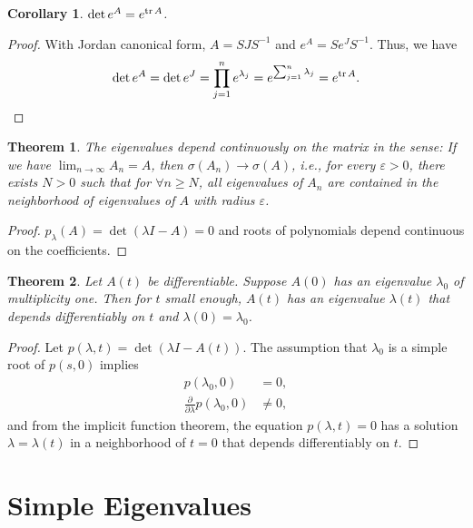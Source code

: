 \documentclass[11pt]{book}
\newtheorem{theorem}{Theorem}[chapter]
\newtheorem{corollary}{Corollary}[theorem]
\theoremstyle{definition}
\numberwithin{equation}{chapter}
\begin{document}
\medskip

\begin{corollary}\label{exponential_trace_corollary}
$\det e^A = e^{\tr A}$.
\end{corollary}
\begin{proof}
With Jordan canonical form, $A = SJS^{-1}$ and $e^A = Se^JS^{-1}$. Thus, we have
\begin{align*}
    \det e^A = \det e^J = \prod^n_{j=1} e^{\lambda_j} = e^{\sum^n_{j=1}\lambda_j} = e^{\tr A}.
\end{align*}
\end{proof}

\medskip

\begin{theorem}
The eigenvalues depend continuously on the matrix in the sense: If we have $\lim_{n\to\infty}A_n = A$, then $\sigma(A_n)\to \sigma(A)$, i.e., for every $\varepsilon > 0$, there exists $N > 0$ such that for $\forall n\geq N$, all eigenvalues of $A_n$ are contained in the neighborhood of eigenvalues of $A$ with radius $\varepsilon$.
\end{theorem}
\begin{proof}
$p_\lambda(A) = \det(\lambda I - A) = 0$ and roots of polynomials depend continuous on the coefficients.
\end{proof}

\medskip

\begin{theorem}
Let $A(t)$ be differentiable. Suppose $A(0)$ has an eigenvalue $\lambda_0$ of multiplicity one. Then for $t$ small enough, $A(t)$ has an eigenvalue $\lambda(t)$ that depends differentiably on $t$ and $\lambda(0) = \lambda_0$.
\end{theorem}
\begin{proof}
Let $p(\lambda, t) = \det (\lambda I - A(t))$. The assumption that $\lambda_0$ is a simple root of $p(s,0)$ implies 
\begin{align*}
    p(\lambda_0,0) & = 0, \\
    \frac{\partial}{\partial \lambda}p(\lambda_0,0) & \neq 0,
\end{align*}
and from the implicit function theorem, the equation $p(\lambda,t) = 0$ has a solution $\lambda = \lambda(t)$ in a neighborhood of $t=0$ that depends differentiably on $t$.
\end{proof}

\medskip

\section{Simple Eigenvalues}
\end{document}
